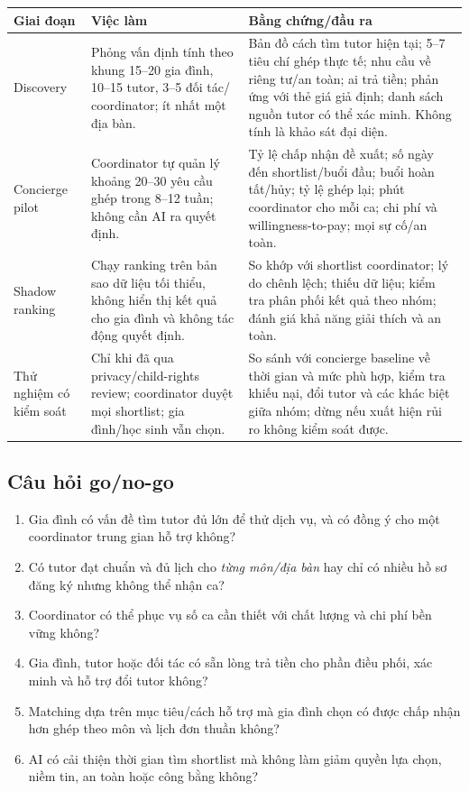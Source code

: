\documentclass[11pt,a4paper]{article}
\begin{document}
\begin{tabularx}{\textwidth}{p{2.55cm}p{3.15cm}Y}
\toprule
\textbf{Giai đoạn} & \textbf{Việc làm} & \textbf{Bằng chứng/đầu ra} \\
\midrule
Discovery &
Phỏng vấn định tính theo khung 15--20 gia đình, 10--15 tutor, 3--5 đối tác/
coordinator; ít nhất một địa bàn. &
Bản đồ cách tìm tutor hiện tại; 5--7 tiêu chí ghép thực tế; nhu cầu về riêng
tư/an toàn; ai trả tiền; phản ứng với thẻ giá giả định; danh sách nguồn tutor
có thể xác minh. Không tính là khảo sát đại diện. \\
\addlinespace
Concierge pilot &
Coordinator tự quản lý khoảng 20--30 yêu cầu ghép trong 8--12 tuần; không cần
AI ra quyết định. &
Tỷ lệ chấp nhận đề xuất; số ngày đến shortlist/buổi đầu; buổi hoàn tất/hủy;
tỷ lệ ghép lại; phút coordinator cho mỗi ca; chi phí và willingness-to-pay;
mọi sự cố/an toàn. \\
\addlinespace
Shadow ranking &
Chạy ranking trên bản sao dữ liệu tối thiểu, không hiển thị kết quả cho gia
đình và không tác động quyết định. &
So khớp với shortlist coordinator; lý do chênh lệch; thiếu dữ liệu; kiểm tra
phân phối kết quả theo nhóm; đánh giá khả năng giải thích và an toàn. \\
\addlinespace
Thử nghiệm có kiểm soát &
Chỉ khi đã qua privacy/child-rights review; coordinator duyệt mọi shortlist;
gia đình/học sinh vẫn chọn. &
So sánh với concierge baseline về thời gian và mức phù hợp, kiểm tra khiếu
nại, đổi tutor và các khác biệt giữa nhóm; dừng nếu xuất hiện rủi ro không
kiểm soát được. \\
\bottomrule
\end{tabularx}

\subsection{Câu hỏi go/no-go}

\begin{enumerate}
  \item Gia đình có vấn đề tìm tutor đủ lớn để thử dịch vụ, và có đồng ý cho
  một coordinator trung gian hỗ trợ không?
  \item Có tutor đạt chuẩn và đủ lịch cho \emph{từng môn/địa bàn} hay chỉ có
  nhiều hồ sơ đăng ký nhưng không thể nhận ca?
  \item Coordinator có thể phục vụ số ca cần thiết với chất lượng và chi phí
  bền vững không?
  \item Gia đình, tutor hoặc đối tác có sẵn lòng trả tiền cho phần điều phối,
  xác minh và hỗ trợ đổi tutor không?
  \item Matching dựa trên mục tiêu/cách hỗ trợ mà gia đình chọn có được chấp
  nhận hơn ghép theo môn và lịch đơn thuần không?
  \item AI có cải thiện thời gian tìm shortlist mà không làm giảm quyền lựa
  chọn, niềm tin, an toàn hoặc công bằng không?
\end{enumerate}
\end{document}
